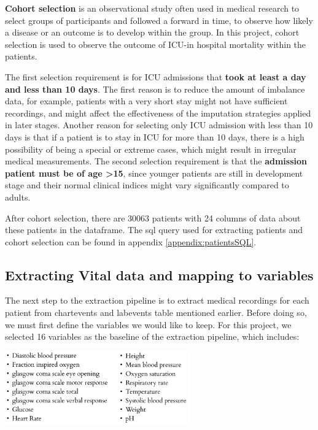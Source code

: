 \documentclass{l4proj}
\begin{document}
    \textbf{Cohort selection} is an observational study often used in medical research to select groups of participants and followed a forward in time, to observe how likely a disease or an outcome is to develop within the group. In this project, cohort selection is used to observe the outcome of ICU-in hospital mortality within the patients. 
    
    The first selection requirement is for ICU admissions that \textbf{took at least a day and less than 10 days}. The first reason is to reduce the amount of imbalance data, for example, patients with a very short stay might not have sufficient recordings, and might affect the effectiveness of the imputation strategies applied in later stages. Another reason for selecting only ICU admission with less than 10 days is that if a patient is to stay in ICU for more than 10 days, there is a high possibility of being a special or extreme cases, which might result in irregular medical measurements. The second selection requirement is that the \textbf{admission patient must be of age >15}, since younger patients are still in development stage and their normal clinical indices might vary significantly compared to adults.
    
    After cohort selection, there are 30063 patients with 24 columns of data about these patients in the dataframe. The sql query used for extracting patients and cohort selection can be found in appendix \ref{appendix:patientsSQL}.


\subsection{Extracting Vital data and mapping to variables}

The next step to the extraction pipeline is to extract medical recordings for each patient from chartevents and labevents table mentioned earlier. Before doing so, we must first define the variables we would like to keep. For this project, we selected 16 variables as the baseline of the extraction pipeline, which includes: 

\begin{center}
   \includegraphics[width=8cm]{dissertation/Latex/images/baseline variables.PNG}
\end{center}
\end{document}
